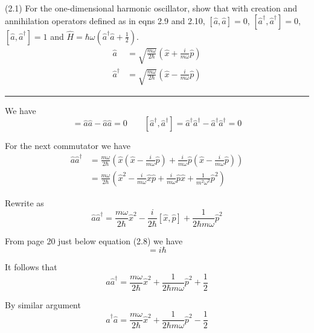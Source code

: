 \documentclass[12pt]{article}
\begin{document}
(2.1)
For the one-dimensional harmonic oscillator, show
that with creation and annihilation operators defined
as in eqns 2.9 and 2.10, $[\hat a,\hat a]=0$,
$[\hat a^\dag,\hat a^\dag]=0$,
$[\hat a,\hat a^\dag]=1$ and
$\hat H=\hbar\omega\left(\hat a^\dag\hat a+\tfrac{1}{2}\right)$.
\begin{align*}
\hat a&=\sqrt{\frac{m\omega}{2\hbar}}
\left(\hat x+\frac{i}{m\omega}\hat p\right)
\tag{2.9}
\\
\hat a^\dag&=\sqrt{\frac{m\omega}{2\hbar}}
\left(\hat x-\frac{i}{m\omega}\hat p\right)
\tag{2.10}
\end{align*}

\bigskip
\hrule

\bigskip
We have
\begin{equation*}
[\hat a,\hat a]=\hat a\hat a-\hat a\hat a=0
\qquad
[\hat a^\dag,\hat a^\dag]=\hat a^\dag\hat a^\dag-\hat a^\dag\hat a^\dag=0
\end{equation*}

For the next commutator we have
\begin{align*}
\hat a\hat a^\dag
&=\frac{m\omega}{2\hbar}
\left(
\hat x\left(\hat x-\frac{i}{m\omega}\hat p\right)
+\frac{i}{m\omega}\hat p\left(\hat x-\frac{i}{m\omega}\hat p\right)
\right)
\\
&=\frac{m\omega}{2\hbar}
\left(
\hat x^2-\frac{i}{m\omega}\hat x\hat p+\frac{i}{m\omega}\hat p\hat x+\frac{1}{m^2\omega^2}\hat p^2\right)
\end{align*}

Rewrite as
\begin{equation*}
\hat a\hat a^\dag
=\frac{m\omega}{2\hbar}\hat x^2-\frac{i}{2\hbar}[\hat x,\hat p]+\frac{1}{2\hbar m\omega}\hat p^2
\end{equation*}

From page 20 just below equation (2.8) we have
\begin{equation*}
[\hat x,\hat p]=i\hbar
\end{equation*}

It follows that
\begin{equation*}
\hat a\hat a^\dag
=\frac{m\omega}{2\hbar}\hat x^2+\frac{1}{2\hbar m\omega}\hat p^2+\frac{1}{2}
\tag{1}
\end{equation*}

By similar argument
\begin{equation*}
\hat a^\dag\hat a
=\frac{m\omega}{2\hbar}\hat x^2+\frac{1}{2\hbar m\omega}\hat p^2-\frac{1}{2}
\tag{2}
\end{equation*}
\end{document}
